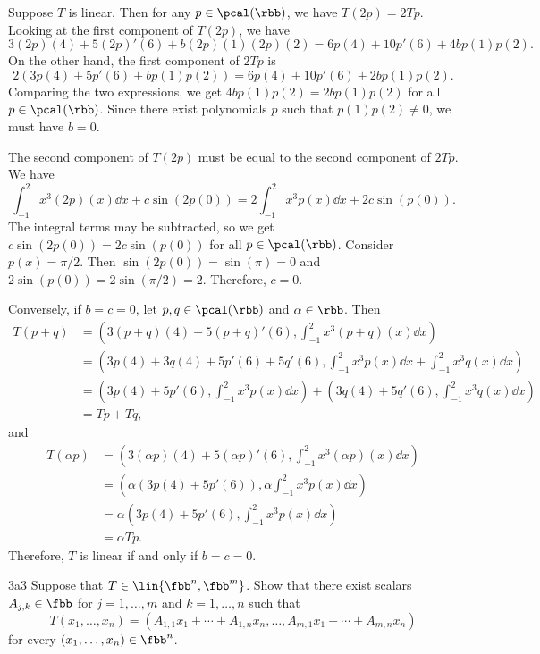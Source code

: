 \begin{sol}
    Suppose $T$ is linear.
	Then for any $p \in \pcal(\rbb)$, we have $T(2p) = 2Tp$.
	Looking at the first component of $T(2p)$, we have
    \[
    	3(2p)(4) + 5(2p)'(6) + b(2p)(1)(2p)(2) = 6p(4) + 10p'(6) + 4bp(1)p(2).
    \]
    On the other hand, the first component of $2Tp$ is
    \[
    	2(3p(4) + 5p'(6) + bp(1)p(2)) = 6p(4) + 10p'(6) + 2bp(1)p(2).
    \]
    Comparing the two expressions, we get $4bp(1)p(2) = 2bp(1)p(2)$ for all $p \in \pcal(\rbb)$.
	Since there exist polynomials $p$ such that $p(1)p(2) \neq 0$, we must have $b = 0$.

    The second component of $T(2p)$ must be equal to the second component of $2Tp$.
	We have
    \[
    	\int_{-1}^{2} x^3 (2p)(x) \dd x + c \sin(2p(0)) = 2\int_{-1}^{2} x^3 p(x) \dd x + 2c \sin (p(0)).
    \]
    The integral terms may be subtracted, so we get $c \sin(2p(0)) = 2c \sin(p(0))$ for all $p \in \pcal(\rbb)$.
	Consider $p(x) = \pi/2$.
	Then $\sin(2p(0)) = \sin(\pi) = 0$ and $2\sin(p(0)) = 2\sin(\pi/2) = 2$.
	Therefore, $c = 0$.

    Conversely, if $b = c = 0$, let $p, q \in \pcal(\rbb)$ and $\alpha \in \rbb$.
	Then
    \begin{align*}
        T(p + q) & = \left(3(p + q)(4) + 5(p + q)'(6), \int_{-1}^{2} x^3 (p + q)(x) \dd x\right) \\
        & = \left(3p(4) + 3q(4) + 5p'(6) + 5q'(6), \int_{-1}^{2} x^3 p(x) \dd x + \int_{-1}^{2} x^3 q(x) \dd x\right) \\
        & = \left(3p(4) + 5p'(6), \int_{-1}^{2} x^3 p(x) \dd x\right) + \left(3q(4) + 5q'(6), \int_{-1}^{2} x^3 q(x) \dd x\right) \\
        & = Tp + Tq,
    \end{align*}
    and
    \begin{align*}
        T(\alpha p) & = \left(3(\alpha p)(4) + 5(\alpha p)'(6), \int_{-1}^{2} x^3 (\alpha p)(x) \dd x\right) \\
        & = \left(\alpha (3p(4) + 5p'(6)), \alpha \int_{-1}^{2} x^3 p(x) \dd x\right) \\
        & = \alpha\left(3p(4) + 5p'(6), \int_{-1}^{2} x^3 p(x) \dd x\right) \\
        & = \alpha Tp.
    \end{align*}
    Therefore, $T$ is linear if and only if $b = c = 0$.
\end{sol}

\begin{exercise}{3a3}
    Suppose that $T \in \lin{\fbb^n, \fbb^m}$.
	Show that there exist scalars $A_{j, k} \in \fbb$ for $j = 1, \ldots, m$ and $k = 1, \ldots, n$ such that
    \[
    	T(x_1, \ldots, x_n) = (A_{1,1} x_1 + \cdots + A_{1, n} x_n, \ldots, A_{m, 1} x_1 + \cdots + A_{m, n} x_n)
    \]
    for every $(x_1, \ldots, x_n) \in \fbb^n$.
\end{exercise}

